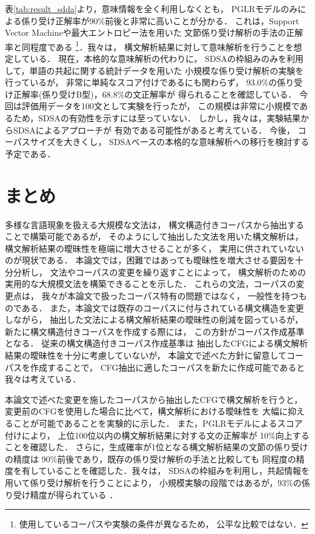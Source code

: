 表\ref{tab:result_sdda}より，意味情報を全く利用しなくとも，
PGLRモデルのみによる係り受け正解率が90\%前後と非常に高いことが分かる．
これは，Support Vector Machineや最大エントロピー法を用いた
文節係り受け解析の手法の正解率と同程度である
\cite{uchimoto:99,kudo:2002}
\footnote{使用しているコーパスや実験の条件が異なるため，
公平な比較ではない．}．我々は，
構文解析結果に対して意味解析を行うことを想定している．
現在，本格的な意味解析の代わりに，
SDSAの枠組みのみを利用して，単語の共起に関する統計データを用いた
小規模な係り受け解析の実験を行っているが，
非常に単純なスコア付けであるにも関わらず，
93.0\%の係り受け正解率(係り受けB型)，68.8\%の文正解率が
得られることを確認している\cite{yagi:2003}．
今回は評価用データを100文として実験を行ったが，
この規模は非常に小規模であるため，SDSAの有効性を示すには至っていない．
しかし，我々は，実験結果からSDSAによるアプローチが
有効である可能性があると考えている．
今後，
コーパスサイズを大きくし，
SDSAベースの本格的な意味解析への移行を検討する予定である．

\section{まとめ}
\label{sec:Conclusion}

多様な言語現象を扱える大規模な文法は，
構文構造付きコーパスから抽出することで構築可能であるが，
そのようにして抽出した文法を用いた構文解析は，
構文解析結果の曖昧性を極端に増大させることが多く，
実用に供されていないのが現状である．
本論文では，困難ではあっても曖昧性を増大させる要因を十分分析し，
文法やコーパスの変更を繰り返すことによって，
構文解析のための実用的な大規模文法を構築できることを示した．
これらの文法，コーパスの変更点は，
我々が本論文で扱ったコーパス特有の問題ではなく，
一般性を持つものである．
また，本論文では既存のコーパスに付与されている構文構造を変更しながら，
抽出した文法による構文解析結果の曖昧性の削減を図っているが，
新たに構文構造付きコーパスを作成する際には，
この方針がコーパス作成基準となる．
従来の構文構造付きコーパス作成基準は
抽出したCFGによる構文解析結果の曖昧性を十分に考慮していないが，
本論文で述べた方針に留意してコーパスを作成することで，
CFG抽出に適したコーパスを新たに作成可能であると我々は考えている．

本論文で述べた変更を施したコーパスから抽出したCFGで構文解析を行うと，
変更前のCFGを使用した場合に比べて，構文解析における曖昧性を
大幅に抑えることが可能であることを実験的に示した．
また，PGLRモデルによるスコア付けにより，
上位100位以内の構文解析結果に対する文の正解率が
10\%向上することを確認した．
さらに，生成確率が1位となる構文解析結果の文節の係り受けの精度は
90\%前後であり，既存の係り受け解析の手法と比較しても
同程度の精度を有していることを確認した．我々は，
SDSAの枠組みを利用し，共起情報を用いて係り受け解析を行うことにより，
小規模実験の段階ではあるが，93\%の係り受け精度が得られている
\cite{yagi:2003}．

